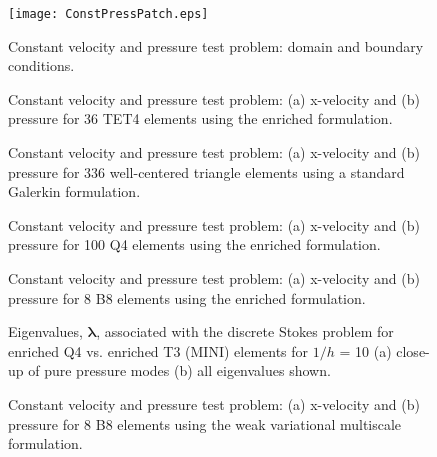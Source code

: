 \documentclass[11pt]{amsart}
\begin{document}
\begin{figure}[htb!]
	\centering
  \texttt{[image: ConstPressPatch.eps]}
	\caption{Constant velocity and pressure test problem: domain and boundary conditions.}
	\label{fig:ConstPressPatch}
\end{figure}
\begin{figure}[htb!]
	\centering
{}
	\caption{Constant velocity and pressure test problem: (a) x-velocity and (b) pressure for 36 TET4 elements using the enriched formulation.}
	\label{fig:TET4VelPress}
\end{figure}
\begin{figure}[htb!]
	\centering
{}
	\caption{Constant velocity and pressure test problem: (a) x-velocity and (b) pressure for 336 well-centered triangle elements using a standard Galerkin formulation.}
	\label{fig:WCTVelPress}
\end{figure}
\begin{figure}[htb!]
	\centering
{}
	\caption{Constant velocity and pressure test problem: (a) x-velocity and (b) pressure for 100 Q4 elements using the enriched formulation.}
	\label{fig:Kabab1}
\end{figure}
\begin{figure}[htb!]
	\centering
{}
	\caption{Constant velocity and pressure test problem: (a) x-velocity and (b) pressure for 8 B8 elements using the enriched formulation.}
	\label{fig:ConstantFlowCoarse}
\end{figure}
\begin{figure}[htb!]
	\centering
	\caption{Eigenvalues, $\boldsymbol{\lambda}$, associated with the discrete Stokes problem for enriched Q4 vs. enriched T3 (MINI) elements for $1/h$ = 10 (a) close-up of pure pressure modes (b) all eigenvalues shown.}
	\label{fig:Eigenvalue}
\end{figure}
\begin{figure}[htb!]
	\centering
{}
	\caption{Constant velocity and pressure test problem: (a) x-velocity and (b) pressure for 8 B8 elements using the weak variational multiscale formulation.}
	\label{fig:StabilizedCoarse}
\end{figure}
\end{document}
